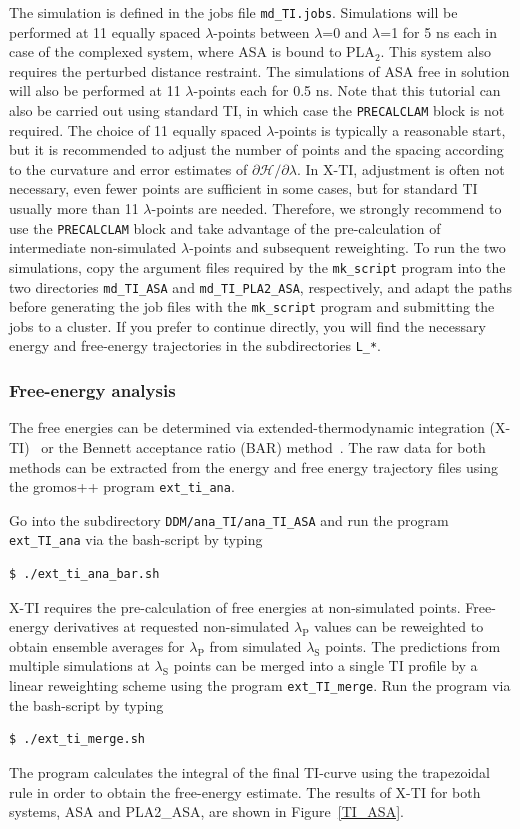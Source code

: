 The simulation is defined in the jobs file \texttt{md\_TI.jobs}. Simulations will be performed at 11 equally spaced $\lambda$-points between $\lambda$=0 and $\lambda$=1 for 5 ns each in case of the complexed system, where ASA is bound to PLA$_2$. This system also requires the perturbed distance restraint. The simulations of ASA free in solution will also be performed at 11 $\lambda$-points each for 0.5 ns.   
Note that this tutorial can also be carried out using standard TI, in which case the \texttt{PRECALCLAM} block is not required. 
The choice of 11 equally spaced $\lambda$-points is typically a reasonable start, but it is recommended to adjust the number of points and the spacing according to the curvature and error estimates of $\partial\mathcal{H}/\partial\lambda$. 
In X-TI, adjustment is often not necessary, even fewer points are sufficient in some cases, but for standard TI usually more than 11 $\lambda$-points are needed. 
Therefore, we strongly recommend to use the \texttt{PRECALCLAM} block and take advantage of the pre-calculation of intermediate non-simulated $\lambda$-points and subsequent reweighting.
To run the two simulations, copy the argument files required by the \texttt{mk\_script} program into the two directories \texttt{md\_TI\_ASA} and \texttt{md\_TI\_PLA2\_ASA}, respectively, and adapt the paths before generating the job files with the \texttt{mk\_script} program and submitting the jobs to a cluster. If you prefer to continue directly, you will find the necessary energy and free-energy trajectories in the subdirectories \texttt{L\_*}.

\subsubsection{Free-energy analysis}
The free energies can be determined via extended-thermodynamic integration (X-TI)~\cite{X_TI} or the Bennett acceptance ratio (BAR) method~\cite{bar}. The raw data for both methods can be extracted from the energy and free energy trajectory files using the gromos++ program \texttt{ext\_ti\_ana}. 

Go into the subdirectory \texttt{DDM/ana\_TI/ana\_TI\_ASA} and run the program \texttt{ext\_TI\_ana} via the bash-script by typing
\begin{lstlisting}
$ ./ext_ti_ana_bar.sh
\end{lstlisting}
%
X-TI requires the pre-calculation of free energies at non-simulated points. Free-energy derivatives at requested non-simulated $\lambda_{\text{P}}$ values can be reweighted to obtain ensemble averages for $\lambda_{\text{P}}$ from simulated $\lambda_{\text{S}}$ points. The predictions from multiple simulations at $\lambda_{\text{S}}$ points can be merged into a single TI profile by a linear reweighting scheme using the program \texttt{ext\_TI\_merge}. 
Run the program via the bash-script by typing
\begin{lstlisting}
$ ./ext_ti_merge.sh
\end{lstlisting}
%
The program calculates the integral of the final TI-curve using the trapezoidal rule in order to obtain the free-energy estimate. The results of X-TI for both systems, ASA and PLA2\_ASA, are shown in Figure~\ref{TI_ASA}.  


